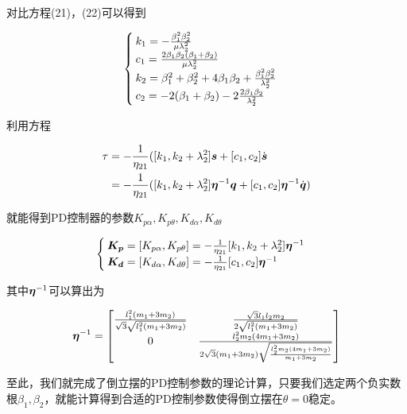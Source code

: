 \documentclass[UTF8]{ctexart}
\begin{document}
对比方程(21)，(22)可以得到

\begin{equation}
    \begin{cases}
        k_1 = -\frac{\beta_1^2\beta_2^2}{\mu\lambda_2^2}\\
        c_1 = \frac{2\beta_1\beta_2(\beta_1+\beta_2)}{\mu\lambda_2^2}\\
        k_2 = \beta_1^2+\beta_2^2+4\beta_1\beta_2+\frac{\beta_1^2\beta_2^2}{\lambda_2^2}\\
        c_2 = -2(\beta_1+\beta_2)-2\frac{2\beta_1\beta_2}{\lambda_2^2}
    \end{cases}
\end{equation}

利用方程

\begin{equation}
    \begin{aligned}
        \tau &= -\frac{1}{\eta_{21}}([k_1,k_2+\lambda_2^2]\boldsymbol{s} + [c_1,c_2]\dot{\boldsymbol{s}}\\
        &= -\frac{1}{\eta_{21}}([k_1,k_2+\lambda_2^2]\boldsymbol{\eta}^{-1}\boldsymbol{q} + [c_1,c_2]\boldsymbol{\eta}^{-1}\dot{\boldsymbol{q}})
    \end{aligned}
\end{equation}

就能得到PD控制器的参数$K_{p\alpha},K_{p\theta},K_{d\alpha},K_{d\theta}$

\begin{equation}
    \begin{cases}
        \boldsymbol{K_p}=[K_{p\alpha},K_{p\theta}]
        =-\frac{1}{\eta_{21}}[k_1,k_2+\lambda_2^2]\boldsymbol{\eta}^{-1}\\
        \boldsymbol{K_d}=[K_{d\alpha},K_{d\theta}]
        =-\frac{1}{\eta_{21}}[c_1,c_2]\boldsymbol{\eta}^{-1}
    \end{cases}
\end{equation}

其中$\boldsymbol{\eta}^{-1}$可以算出为

\begin{equation}
    \boldsymbol{\eta}^{-1} =
\begin{bmatrix}
 \frac{l_1^2 (m_1+3 m_2)}{\sqrt{3} \sqrt{l_1^2 (m_1+3 m_2)}} & \frac{\sqrt{3} l_1 l_2 m_2}{2 \sqrt{l_1^2 (m_1+3 m_2)}} \\
 0 & \frac{l_2^2 m_2 (4 m_1+3 m_2)}{2 \sqrt{3} (m_1+3 m_2) \sqrt{\frac{l_2^2 m_2 (4 m_1+3 m_2)}{m_1+3 m_2}}} \\
\end{bmatrix}
\end{equation}

至此，我们就完成了倒立摆的PD控制参数的理论计算，只要我们选定两个负实数根$\beta_1,\beta_2$，就能计算得到合适的PD控制参数使得倒立摆在$\theta = 0$稳定。
\end{document}
